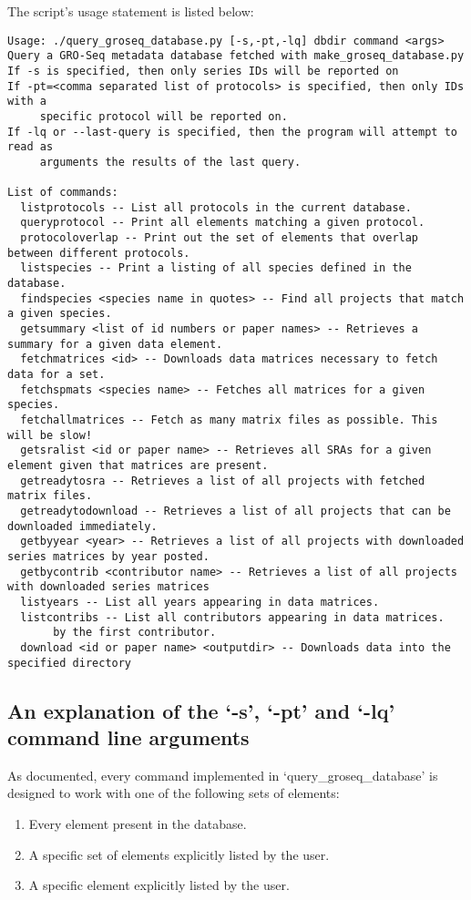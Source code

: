 \documentclass[12pt,letterpaper]{article}
\begin{document}
The script's usage statement is listed below:
\begin{verbatim}
Usage: ./query_groseq_database.py [-s,-pt,-lq] dbdir command <args>
Query a GRO-Seq metadata database fetched with make_groseq_database.py
If -s is specified, then only series IDs will be reported on
If -pt=<comma separated list of protocols> is specified, then only IDs with a 
     specific protocol will be reported on.
If -lq or --last-query is specified, then the program will attempt to read as 
     arguments the results of the last query.

List of commands:
  listprotocols -- List all protocols in the current database.
  queryprotocol -- Print all elements matching a given protocol.
  protocoloverlap -- Print out the set of elements that overlap between different protocols.
  listspecies -- Print a listing of all species defined in the database.
  findspecies <species name in quotes> -- Find all projects that match a given species.
  getsummary <list of id numbers or paper names> -- Retrieves a summary for a given data element.
  fetchmatrices <id> -- Downloads data matrices necessary to fetch data for a set.
  fetchspmats <species name> -- Fetches all matrices for a given species.
  fetchallmatrices -- Fetch as many matrix files as possible. This will be slow!
  getsralist <id or paper name> -- Retrieves all SRAs for a given element given that matrices are present.
  getreadytosra -- Retrieves a list of all projects with fetched matrix files.
  getreadytodownload -- Retrieves a list of all projects that can be downloaded immediately.
  getbyyear <year> -- Retrieves a list of all projects with downloaded series matrices by year posted.
  getbycontrib <contributor name> -- Retrieves a list of all projects with downloaded series matrices
  listyears -- List all years appearing in data matrices.
  listcontribs -- List all contributors appearing in data matrices.
       by the first contributor.
  download <id or paper name> <outputdir> -- Downloads data into the specified directory
\end{verbatim}

\subsection{An explanation of the `-s', `-pt' and `-lq' command line arguments}
As documented, every command implemented in `query\_groseq\_database' is designed to work with one of the following sets of 
elements:
\begin{enumerate}
 \item Every element present in the database.
 \item A specific set of elements explicitly listed by the user.
 \item A specific element explicitly listed by the user.
\end{enumerate}
\end{document}
